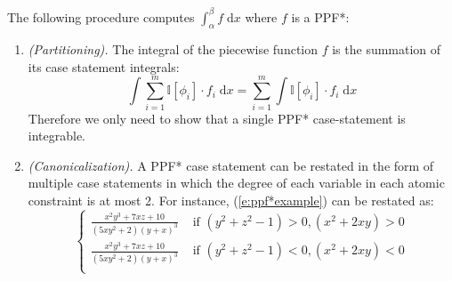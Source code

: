 \documentclass[letterpaper]{article}
\newcommand{\indicator}{\mathbb{I}}%
\newcommand{\case}[2]{#2 &\text{ if } #1}%
\newcommand{\otherwise}[1]{#1 &\text{ otherwise}}
\newcommand{\dd}{\;\mathrm{d}} %
\begin{document}
The following procedure computes $\int_{\alpha}^\beta f \dd x$ where $f$ is a PPF*:

\begin{enumerate}[leftmargin=2.6ex]
\item \emph{(Partitioning).}
The integral of the piecewise function $f$ is the summation of its case statement integrals:
{\footnotesize
\begin{equation*}
\int \sum_{i=1}^m \indicator[\phi_i]\cdot f_i \dd x = 
\sum_{i=1}^m \int \indicator[\phi_i] \cdot f_i \dd x
\end{equation*}
}
Therefore we only need to show that a single PPF* case-statement is integrable.

\item \emph{(Canonicalization).} A PPF* case statement can be restated in the form of multiple case statements in which 
the degree of each variable in each atomic constraint is at most 2.
For instance, (\ref{e:ppf*example}) can be restated as:
\begin{equation}
\begin{cases}
\case{(y^2+z^2 -1)>0, (x^2+2xy)>0}{\frac{x^2 y^3 + 7xz + 10}{(5xy^2 + 2)(y + x)^3}}\\
\case{(y^2+z^2 -1)<0, (x^2+2xy)<0}{\frac{x^2 y^3 + 7xz + 10}{(5xy^2 + 2)(y + x)^3}}\\
\end{cases}
\end{equation}


\end{enumerate}
\end{document}
